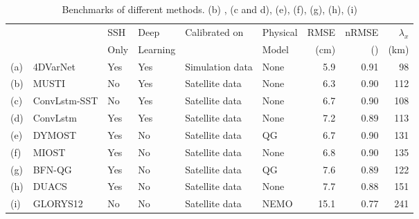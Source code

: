 \begin{table}[h!]
\begin{tabular}{ll||llll|rrr|}
\toprule
 && SSH  & Deep  & Calibrated on & Physical  & RMSE & nRMSE  & $\lambda_x$ \\
 &&  Only &  Learning & &  Model &  (cm) &  () &  (km) \\
\midrule
(a) & 4DVarNet &  Yes & Yes & Simulation data & None & 5.9  & 0.91  & 98 \\
(b) & MUSTI & No &  Yes & Satellite data & None & 6.3  & 0.90  & 112 \\
(c) & ConvLstm-SST & No &  Yes & Satellite data & None & 6.7  & 0.90  & 108 \\
(d) & ConvLstm &  Yes &  Yes & Satellite data & None & 7.2  & 0.89  & 113 \\
(e) & DYMOST&  Yes & No & Satellite data & QG & 6.7  & 0.90  & 131 \\
(f) & MIOST &  Yes & No & Satellite data & None & 6.8  & 0.90  & 135 \\
(g) & BFN-QG &  Yes & No & Satellite data & QG & 7.6  & 0.89  & 122 \\
(h) & DUACS &  Yes & No & Satellite data & None & 7.7  & 0.88  & 151 \\
(i) & GLORYS12 & No & No & Satellite data & NEMO & 15.1  & 0.77  & 241 \\
\bottomrule
\end{tabular}
\caption{Benchmarks of different methods. (b) \cite{Archambault_Filoche_Charantonnis_Béréziat_2023}, (c and d)\cite{Martin_Manucharyan_Klein_2023}, (e)\cite{Ballarotta_Ubelmann_Rogé_Fournier_Faugère_Dibarboure_Morrow_Picot_2020}, (f)\cite{Ubelmann_Dibarboure_Gaultier_Ponte_Ardhuin_Ballarotta_Faugère_2021}, (g)\cite{Guillou_Metref_Cosme_Ubelmann_Ballarotta_Sommer_Verron_2021}, (h)\cite{Taburet_Sanchez-Roman_Ballarotta_Pujol_Legeais_Fournier_Faugere_Dibarboure_2019}, (i)\cite{Jean_Michel_Eric_Romain_Gilles_Angélique_Marie_Clément_Mathieu_Olivier_Charly_et_al._2021}  }
\label{tab:bench}
\end{table}